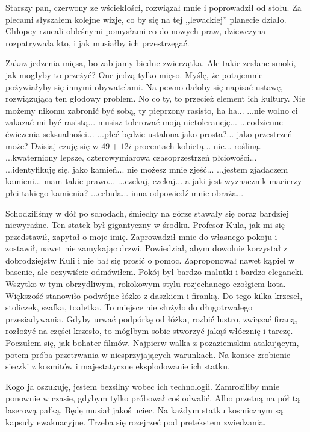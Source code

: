Starszy pan, czerwony ze wściekłości, rozwiązał mnie i poprowadził od stołu. 
Za plecami słyszałem kolejne wizje, co by się na tej ,,lewackiej'' planecie działo.
Chłopcy rzucali obleśnymi pomysłami co do nowych praw, dziewczyna rozpatrywała kto, i jak musiałby ich przestrzegać.
\begin{dialogue}
\ds{} Zakaz jedzenia mięsa, bo zabijamy biedne zwierzątka.
\ds{} Ale takie zesłane smoki, jak mogłyby to przeżyć? One jedzą tylko mięso.
\ds{} Myślę, że potajemnie pożywiałyby się innymi obywatelami.
\ds{} Na pewno dałoby się napisać ustawę, rozwiązującą ten głodowy problem.
\ds{} No co ty, to przecież element ich kultury. Nie możemy nikomu zabronić być sobą, ty pieprzony rasisto, ha ha...
\ds{} ...nie wolno ci zakazać mi być rasistą... musisz tolerować moją nietolerancję...
\ds{} ...codzienne ćwiczenia seksualności...
\ds{} ...płeć będzie ustalona jako prosta?... jako przestrzeń może?
\ds{} Dzisiaj czuję się w $49 + 12i$ procentach kobietą... nie... rośliną.
\ds{} ...kwaterniony lepsze, czterowymiarowa czasoprzestrzeń płciowości...
\ds{} ...identyfikuję się, jako kamień... nie możesz mnie zjeść...
\ds{} ...jestem zjadaczem kamieni... mam takie prawo...
\ds{} ...czekaj, czekaj... a jaki jest wyznacznik macierzy płci takiego kamienia?
\ds{} ...cebula... inna odpowiedź mnie obraża...
\end{dialogue}

Schodziliśmy w dół po schodach, śmiechy na górze stawały się coraz bardziej niewyraźne.
Ten statek był gigantyczny w środku. Profesor Kula, jak mi się przedstawił, zapytał o moje imię.
Zaprowadził mnie do własnego pokoju i zostawił, nawet nie zamykając drzwi. 
Powiedział, abym dowolnie korzystał z dobrodziejstw Kuli i nie bał się prosić o pomoc. 
Zaproponował nawet kąpiel w basenie, ale oczywiście odmówiłem.
Pokój był bardzo malutki i bardzo elegancki.
Wszytko w tym obrzydliwym, rokokowym stylu rozjechanego czołgiem kota.
Większość stanowiło podwójne łóżko z daszkiem i firanką.
Do tego kilka krzeseł, stoliczek, szafka, toaletka.
To miejsce nie służyło do długotrwałego przesiadywania.
Gdyby urwać podpórkę od łóżka, rozbić lustro, związać firaną, rozłożyć na części krzesło, to mógłbym sobie stworzyć jakąś włócznię i tarczę.
Poczułem się, jak bohater filmów. Najpierw walka z pozaziemskim atakującym, potem próba przetrwania w niesprzyjających warunkach.
Na koniec zrobienie sieczki z kosmitów i majestatyczne eksplodowanie ich statku.

Kogo ja oszukuję, jestem bezsilny wobec ich technologii.
Zamroziliby mnie ponownie w czasie, gdybym tylko próbował coś odwalić.
Albo przetną na pół tą laserową pałką.
Będę musiał jakoś uciec. Na każdym statku kosmicznym są kapsuły ewakuacyjne.
Trzeba się rozejrzeć pod pretekstem zwiedzania.

